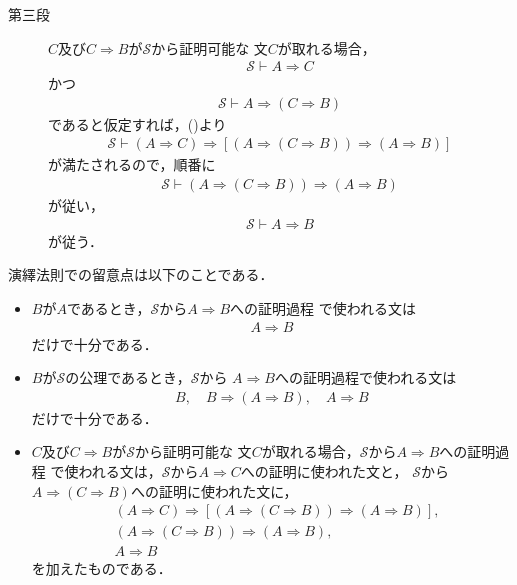 \begin{metaprf}
\begin{description}
			\item[第三段]
				$C$及び$C \Longrightarrow B$が$\mathscr{S}$から証明可能な
				文$C$が取れる場合，
				\begin{align}
					\mathscr{S} \vdash A \Longrightarrow C
				\end{align}
				かつ
				\begin{align}
					\mathscr{S} \vdash A \Longrightarrow (C \Longrightarrow B)
				\end{align}
				であると仮定すれば，()より
				\begin{align}
					\mathscr{S} \vdash 
					(A \Longrightarrow C) \Longrightarrow [(A \Longrightarrow (
					C \Longrightarrow B)) \Longrightarrow (A \Longrightarrow B)]
				\end{align}
				が満たされるので，順番に
				\begin{align}
					\mathscr{S} \vdash (A \Longrightarrow (
					C \Longrightarrow B)) \Longrightarrow (A \Longrightarrow B)
				\end{align}
				が従い，
				\begin{align}
					\mathscr{S} \vdash A \Longrightarrow B
				\end{align}
				が従う．
				\QED
		\end{description}
	\end{metaprf}
	
	演繹法則での留意点は以下のことである．
	\begin{screen}
		\begin{itemize}
			\item $B$が$A$であるとき，$\mathscr{S}$から$A \Longrightarrow B$への証明過程
				で使われる文は
				\begin{align}
					A \Longrightarrow B
				\end{align}
				だけで十分である．
				
			\item $B$が$\mathscr{S}$の公理であるとき，$\mathscr{S}$から
				$A \Longrightarrow B$への証明過程で使われる文は
				\begin{align}
					B,\quad B \Longrightarrow (A \Longrightarrow B),\quad A \Longrightarrow B
				\end{align}
				だけで十分である．
				
			\item $C$及び$C \Longrightarrow B$が$\mathscr{S}$から証明可能な
				文$C$が取れる場合，$\mathscr{S}$から$A \Longrightarrow B$への証明過程
				で使われる文は，$\mathscr{S}$から$A \Longrightarrow C$への証明に使われた文と，
				$\mathscr{S}$から$A \Longrightarrow (C \Longrightarrow B)$への証明に使われた文に，
				\begin{align}
					&(A \Longrightarrow C) \Longrightarrow [(A \Longrightarrow (
					C \Longrightarrow B)) \Longrightarrow (A \Longrightarrow B)], \\
					&(A \Longrightarrow (
					C \Longrightarrow B)) \Longrightarrow (A \Longrightarrow B), \\
					&A \Longrightarrow B
				\end{align}
				を加えたものである．
		\end{itemize}
	\end{screen}
	
